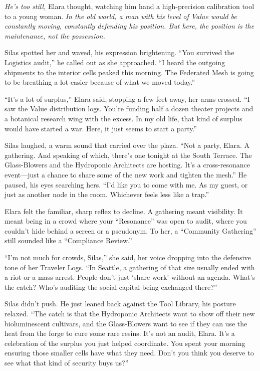 \textit{He's too still,} Elara thought, watching him hand a high-precision calibration tool to a young woman. \textit{In the old world, a man with his level of Value would be constantly moving, constantly defending his position. But here, the position is the maintenance, not the possession.} 

Silas spotted her and waved, his expression brightening. ``You survived the Logistics audit,'' he called out as she approached. ``I heard the outgoing shipments to the interior cells peaked this morning. The Federated Mesh is going to be breathing a lot easier because of what we moved today.''

``It's a lot of surplus,'' Elara said, stopping a few feet away, her arms crossed. ``I saw the Value distribution logs. You're funding half a dozen theater projects and a botanical research wing with the excess. In my old life, that kind of surplus would have started a war. Here, it just seems to start a party.''

Silas laughed, a warm sound that carried over the plaza. ``Not a party, Elara. A gathering. And speaking of which, there's one tonight at the South Terrace. The Glass-Blowers and the Hydroponic Architects are hosting. It's a cross-resonance event—just a chance to share some of the new work and tighten the mesh.'' He paused, his eyes searching hers. ``I'd like you to come with me. As my guest, or just as another node in the room. Whichever feels less like a trap.''


Elara felt the familiar, sharp reflex to decline. A gathering meant visibility. It meant being in a crowd where your ``Resonance'' was open to audit, where you couldn't hide behind a screen or a pseudonym. To her, a ``Community Gathering'' still sounded like a ``Compliance Review.'' 

``I'm not much for crowds, Silas,'' she said, her voice dropping into the defensive tone of her Traveler Logs. ``In Seattle, a gathering of that size usually ended with a riot or a mass-arrest. People don't just `share work' without an agenda. What's the catch? Who's auditing the social capital being exchanged there?''

Silas didn't push. He just leaned back against the Tool Library, his posture relaxed. ``The catch is that the Hydroponic Architects want to show off their new bioluminescent cultivars, and the Glass-Blowers want to see if they can use the heat from the forge to cure some rare resins. It's not an audit, Elara. It's a celebration of the surplus you just helped coordinate. You spent your morning ensuring those smaller cells have what they need. Don't you think you deserve to see what that kind of security buys us?''

